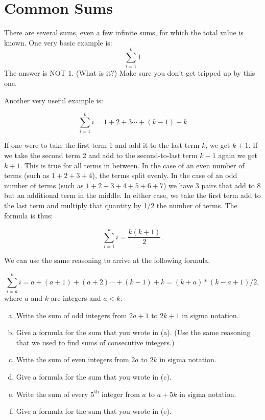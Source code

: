 \section{Common Sums\quad
{}}
There are several sums, even a few infinite sums, for which the total value is known. One very basic example is:
\[\sum_{i=1}^{k}1\]
The answer is NOT 1. (What is it?) Make sure you don't get tripped up by this one.

Another very useful example is:

\[\sum_{i=1}^{k}i=1+2+3\cdots+(k-1) + k\]

If one were to take the first term 1 and add it to the last term $k$, we get $k+1$.  If we take the second term 2 and add to the second-to-last term $k-1$ again we get $k+1$.  This is true for all terms in between.  In the case of an even number of terms (such as $1+2+3+4$),  the terms split evenly.  In the case of an odd number of terms (such as $1+2+3+4+5+6+7$) we have 3 pairs that add to 8 but an additional term in the middle.  In either case, we take the first term add to the last term and multiply that quantity by 1/2 the number of terms.  The formula is thus:

\[\sum_{i=1}^{k}i= \frac{k(k+1)}{2}.\] 

We can use the same reasoning to arrive at the following formula.

\[\sum_{i=a}^{k}i=a+(a+1)+(a+2)\cdots+(k-1) + k = (k+a)*(k-a+1)/2,\] 
where $a$ and $k$ are integers and $a<k$.

\begin {exercise}{}
\begin {enumerate}[(a)]
\item 
Write the sum of odd integers from $2a+1$ to $2k+1$ in sigma notation.
\item
Give a formula for the sum that you wrote in (a).  (Use the same reasoning that we used to find sums of consecutive integers.)
\item 
Write the sum of even integers from $2a$ to $2k$ in sigma notation.
\item
Give a formula for the sum that you wrote in (c). 
\item 
Write the sum of every $5^{\text{th}}$ integer from $a$ to $a + 5k$ in sigma notation.
\item
Give a formula for the sum that you wrote in (e). 
\end {enumerate}
\end {exercise}

